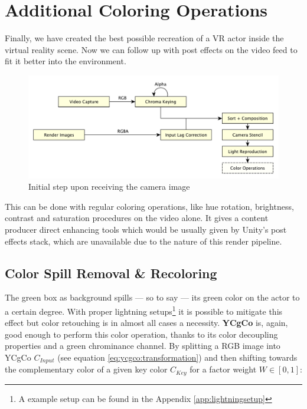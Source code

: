 %
\section{Additional Coloring Operations}

Finally, we have created the best possible recreation of a VR actor inside the 
virtual reality scene. Now we can follow up with post effects on the video feed 
to fit it better into the environment.

\begin{figure}[htb]
	\includegraphics[width=\textwidth]{gfx/pipeline/4_8_color.pdf}
	\caption{Initial step upon receiving the camera image}
	\label{fig:steps:recolor}
\end{figure}

This can be done with regular coloring operations, like hue rotation, 
brightness, contrast and saturation procedures on the video alone. It gives a 
content producer direct enhancing tools which would be usually given by Unity's 
post effects stack, which are unavailable due to the nature of this render 
pipeline.

\subsection{Color Spill Removal \& Recoloring}

The green box as background spills --- so to say --- its green color on the 
actor to a certain degree. With proper lightning setups\footnote{A example 
setup can be found in the Appendix \ref{app:lightningsetup}} it is possible to 
mitigate this effect but color retouching is in almost all cases a necessity. 
\textbf{YCgCo} is, again, good enough to perform this color operation, thanks 
to its color decoupling properties and a green chrominance channel. By 
splitting a RGB image into YCgCo $C_{Input}$ (see equation 
\eqref{eq:ycgco:transformation}) and then shifting towards the complementary 
color of a given key color $C_{Key}$ for a factor weight $W \in [0, 1]$:

